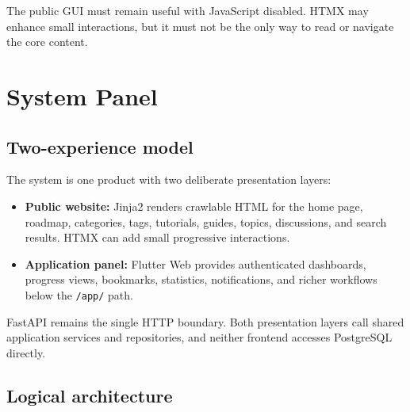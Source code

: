 \documentclass[11pt,a4paper]{article}
\begin{document}
The public GUI must remain useful with JavaScript disabled. HTMX may enhance small
interactions, but it must not be the only way to read or navigate the core content.

\section{System Panel}

\subsection{Two-experience model}

The system is one product with two deliberate presentation layers:

\begin{itemize}
  \item \textbf{Public website:} Jinja2 renders crawlable HTML for the home page,
        roadmap, categories, tags, tutorials, guides, topics, discussions, and
        search results. HTMX can add small progressive interactions.
  \item \textbf{Application panel:} Flutter Web provides authenticated dashboards,
        progress views, bookmarks, statistics, notifications, and richer workflows
        below the \texttt{/app/} path.
\end{itemize}

FastAPI remains the single HTTP boundary. Both presentation layers call shared
application services and repositories, and neither frontend accesses PostgreSQL
directly.

\clearpage
\subsection{Logical architecture}
\end{document}
